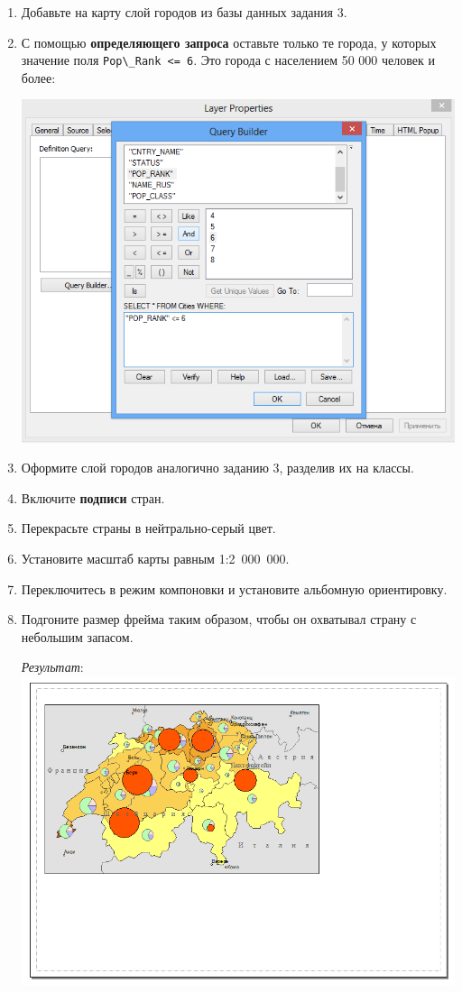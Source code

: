 \documentclass[]{book}
\theoremstyle{definition}
\theoremstyle{definition}
\theoremstyle{definition}
\theoremstyle{remark}
\begin{document}
\begin{enumerate}
\def\labelenumi{\arabic{enumi}.}
\item
  Добавьте на карту слой городов из базы данных задания 3.
\item
  С помощью \textbf{определяющего запроса} оставьте только те города, у
  которых значение поля
  \texttt{Pop\textbackslash{}\_Rank\ \textless{}=\ 6}. Это города с
  населением 50 000 человек и более:

  \includegraphics{images/Ex08/image31.png}
\item
  Оформите слой городов аналогично заданию 3, разделив их на классы.
\item
  Включите \textbf{подписи} стран.
\item
  Перекрасьте страны в нейтрально-серый цвет.
\item
  Установите масштаб карты равным 1:2~000~000.
\item
  Переключитесь в режим компоновки и установите альбомную ориентировку.
\item
  Подгоните размер фрейма таким образом, чтобы он охватывал страну с
  небольшим запасом.

  \emph{Результат}: \includegraphics{images/Ex08/image32.png}


\end{enumerate}
\end{document}
